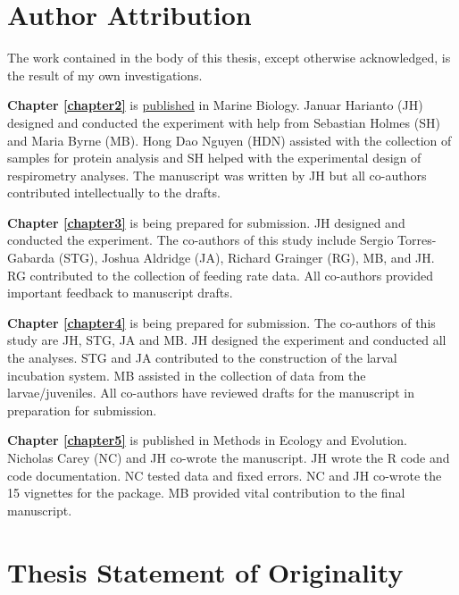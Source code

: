 \SingleSpacing


\section*{Author Attribution}

The work contained in the body of this thesis, except otherwise acknowledged, is the result of my own investigations. 

\textbf{Chapter \ref{chapter2}} is \href{https://doi.org/10/gdqdv4}{published} in Marine Biology. 
Januar Harianto (JH) designed and conducted the experiment with help from Sebastian Holmes (SH) and Maria Byrne (MB).
Hong Dao Nguyen (HDN) assisted with the collection of samples for protein analysis and SH helped with the experimental design of respirometry analyses. 
The manuscript was written by JH but all co-authors contributed intellectually to the drafts.

\textbf{Chapter \ref{chapter3}} is being prepared for submission. 
JH designed and conducted the experiment. 
The co-authors of this study include Sergio Torres-Gabarda (STG), Joshua Aldridge (JA), Richard Grainger (RG), MB, and JH. 
RG contributed to the collection of feeding rate data. 
All co-authors provided important feedback to manuscript drafts.

\textbf{Chapter \ref{chapter4}} is being prepared for submission.
The co-authors of this study are JH, STG, JA and MB. 
JH designed the experiment and conducted all the analyses. 
STG and JA contributed to the construction of the larval incubation system.
MB assisted in the collection of data from the larvae/juveniles.
All co-authors have reviewed drafts for the manuscript in preparation for submission.

\textbf{Chapter \ref{chapter5}} is published in Methods in Ecology and Evolution.
Nicholas Carey (NC) and JH co-wrote the manuscript. 
JH wrote the R code and code documentation. 
NC tested data and fixed errors.
NC and JH co-wrote the 15 vignettes for the package. 
MB provided vital contribution to the final manuscript.

\vfill
\hrulefill


\section*{Thesis Statement of Originality}

